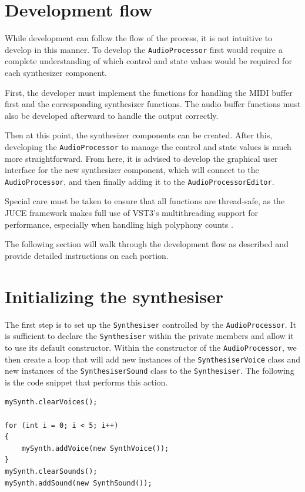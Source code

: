 \documentclass[a4paper,12pt]{report}
\begin{document}
\section{Development flow}
\label{sec:devflow}
While development can follow the flow of the process, it is not intuitive to develop in this manner. To develop the \texttt{Audio\-Processor} first would require a complete understanding of which control and state values would be required for each synthesizer component.

First, the developer must implement the functions for handling the MIDI buffer first and the corresponding synthesizer functions. The audio buffer functions must also be developed afterward to handle the output correctly.

Then at this point, the synthesizer components can be created. After this, developing the \texttt{Audio\-Processor} to manage the control and state values is much more straightforward. From here, it is advised to develop the graphical user interface for the new synthesizer component, which will connect to the \texttt{Audio\-Processor}, and then finally adding it to the \texttt{Audio\-Processor\-Editor}.

Special care must be taken to ensure that all functions are thread-safe, as the JUCE framework makes full use of VST3's multithreading support for performance, especially when handling high polyphony counts \cite{juceclassindex}.

The following section will walk through the development flow as described and provide detailed instructions on each portion.

\section{Initializing the synthesiser}
\label{sec:initializesynthesizer}
The first step is to set up the \texttt{Synthesiser} controlled by the \texttt{Audio\-Processor}. It is sufficient to declare the \texttt{Synthesiser} within the private members and allow it to use its default constructor. 
Within the constructor of the \texttt{Audio\-Processor}, we then create a loop that will add new instances of the \texttt{Synthesiser\-Voice} class and new instances of the \texttt{Synthesiser\-Sound} class to the \texttt{Synthesiser}. The following is the code snippet that performs this action.

 \noindent\begin{minipage}{\linewidth} \begin{lstlisting}[caption={Instantiating Voices},label={code:instantiatingvoices},captionpos=b]
mySynth.clearVoices();
    
for (int i = 0; i < 5; i++)
{
    mySynth.addVoice(new SynthVoice());
}
mySynth.clearSounds();
mySynth.addSound(new SynthSound());
\end{lstlisting}
\end{minipage}
\end{document}
